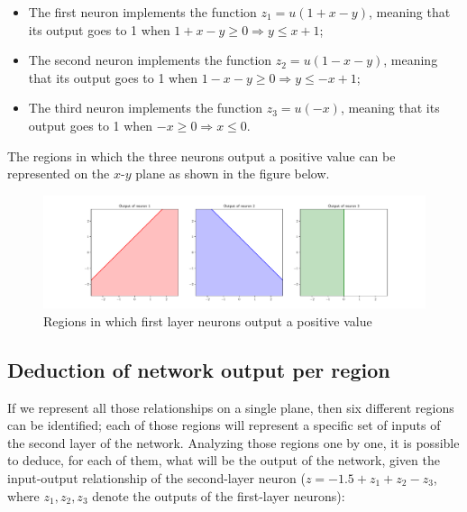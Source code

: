 \documentclass[letterpaper,headings=standardclasses]{scrartcl}
\begin{document}
\begin{itemize}

\item The first neuron implements the function $z_1 = u(1 + x - y)$, meaning that its output goes to 1 when $1 + x - y \ge 0 \Rightarrow y \le x + 1$;
\item The second neuron implements the function $z_2 = u(1 - x - y)$, meaning that its output goes to 1 when $1 - x - y \ge 0 \Rightarrow y \le -x + 1$;
\item The third neuron implements the function $z_3 = u(-x)$, meaning that its output goes to 1 when $-x \ge 0 \Rightarrow x \le 0$.

\end{itemize}

The regions in which the three neurons output a positive value can be represented on the $x$-$y$ plane as shown in the figure below.

\begin{figure}[h]
\centering
\includegraphics[width=\linewidth]{first_layer_out_sep.pdf}
\caption{Regions in which first layer neurons output a positive value}
\end{figure}

\subsection{Deduction of network output per region}

If we represent all those relationships on a single plane, then six different regions can be identified; each of those regions will represent a specific set of inputs of the second layer of the network. Analyzing those regions one by one, it is possible to deduce, for each of them, what will be the output of the network, given the input-output relationship of the second-layer neuron ($z = -1.5 + z_1 + z_2 - z_3$, where $z_1, z_2, z_3$ denote the outputs of the first-layer neurons):
\end{document}

